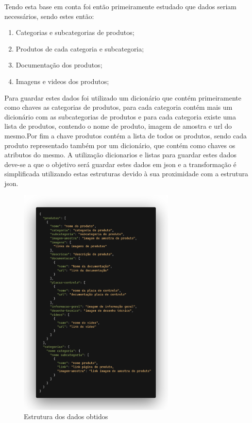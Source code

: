 Tendo esta base em conta foi então primeiramente estudado que dados seriam necessários, sendo estes então:
\begin{enumerate}
    \item Categorias e subcategorias de produtos;
    \item Produtos de cada categoria e subcategoria;
    \item Documentação dos produtos;
    \item Imagens e videos dos produtos;
\end{enumerate}

\newpage

Para guardar estes dados foi utilizado um dicionário que contém primeiramente como chaves as categorias de produtos,
para cada categoria contém mais um dicionário com as subcategorias de produtos e para cada categoria existe uma lista
de produtos, contendo o nome de produto, imagem de amostra e url do mesmo.Por fim a chave produtos contém a lista de 
todos os produtos, sendo cada produto representado também por um dicionário, que contém como chaves os atributos do mesmo.
A utilização dicionarios e listas para guardar estes dados deve-se a que o objetivo será guardar estes dados 
em json e a transformação é simplificada utilizando estas estruturas devido à sua proximidade com a estrutura
json.

\begin{figure}[htb]
    \centering
    
    \includegraphics[width=0.7\textwidth]{images/implementacao/scraper/estrutura_scraper.png}
    \caption{Estrutura dos dados obtidos}
    \label{fig:49}
\end{figure}

